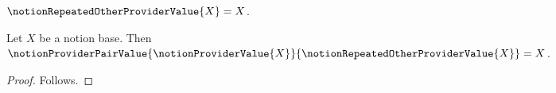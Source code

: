 

\begin{definition}\label{notion_repeated_other_provider_value}
    $\notionRepeatedOtherProviderValue{X}=X$.
\end{definition}

\begin{proposition}\label{notion_provider_repeated_equal_core_missing}
    Let $X$ be a notion base.
    Then $\notionProviderPairValue
        {\notionProviderValue{X}}
        {\notionRepeatedOtherProviderValue{X}}=X$.
\end{proposition}
\begin{proof}
    Follows.
\end{proof}

